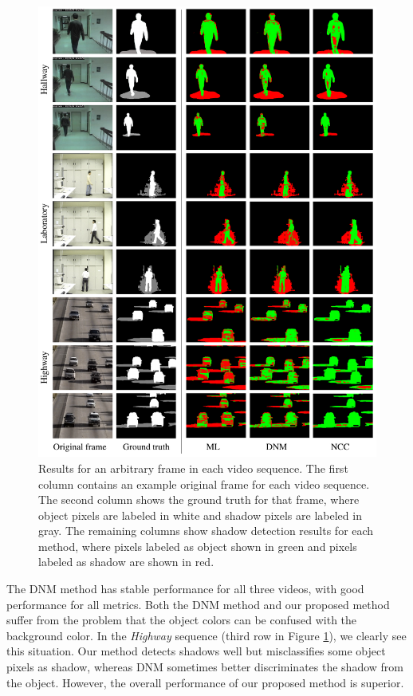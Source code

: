 \begin{figure}[t]
  \centering
  \includegraphics[width=5.9in]{figures/fig-shadow-results}
  \caption[Results for an arbitrary frame in each video
    sequence.]{\small Results for an arbitrary frame in each video
    sequence. The first column contains an example original frame for
    each video sequence. The second column shows the ground truth for
    that frame, where object pixels are labeled in white and shadow
    pixels are labeled in gray. The remaining columns show shadow
    detection results for each method, where pixels labeled as object
    shown in green and pixels labeled as shadow are shown in red.}
  \label{fig:results-for-arbitrary-frame}
\end{figure}

The DNM method has stable performance for all three videos, with good
performance for all metrics. Both the DNM method and our proposed
method suffer from the problem that the object colors can be confused
with the background color.  In the \textit{Highway} sequence (third
row in Figure \ref{fig:results-for-arbitrary-frame}), we clearly see
this situation. Our method detects shadows well but misclassifies some
object pixels as shadow, whereas DNM sometimes better discriminates
the shadow from the object.  However, the overall performance of our
proposed method is superior.

